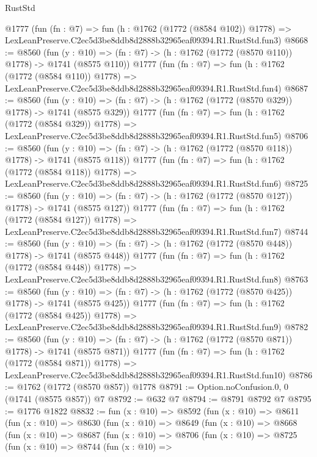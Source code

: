 \begin{lexlean}{RustStd}
\begin{coremodule}
    @1777
    (fun (fn : @7) =>
    fun (h : @1762 (@1772 (@8584 @102)) @1778) =>
    LexLeanPreserve.C2ec5d3be8ddb8d2888b32965eaf09394.R1.RustStd.fun3)
@8668 := @8560
    (fun (y : @10) => (fn : @7) -> (h : @1762 (@1772 (@8570 @110)) @1778) -> @1741 (@8575 @110))
    @1777
    (fun (fn : @7) =>
    fun (h : @1762 (@1772 (@8584 @110)) @1778) =>
    LexLeanPreserve.C2ec5d3be8ddb8d2888b32965eaf09394.R1.RustStd.fun4)
@8687 := @8560
    (fun (y : @10) => (fn : @7) -> (h : @1762 (@1772 (@8570 @329)) @1778) -> @1741 (@8575 @329))
    @1777
    (fun (fn : @7) =>
    fun (h : @1762 (@1772 (@8584 @329)) @1778) =>
    LexLeanPreserve.C2ec5d3be8ddb8d2888b32965eaf09394.R1.RustStd.fun5)
@8706 := @8560
    (fun (y : @10) => (fn : @7) -> (h : @1762 (@1772 (@8570 @118)) @1778) -> @1741 (@8575 @118))
    @1777
    (fun (fn : @7) =>
    fun (h : @1762 (@1772 (@8584 @118)) @1778) =>
    LexLeanPreserve.C2ec5d3be8ddb8d2888b32965eaf09394.R1.RustStd.fun6)
@8725 := @8560
    (fun (y : @10) => (fn : @7) -> (h : @1762 (@1772 (@8570 @127)) @1778) -> @1741 (@8575 @127))
    @1777
    (fun (fn : @7) =>
    fun (h : @1762 (@1772 (@8584 @127)) @1778) =>
    LexLeanPreserve.C2ec5d3be8ddb8d2888b32965eaf09394.R1.RustStd.fun7)
@8744 := @8560
    (fun (y : @10) => (fn : @7) -> (h : @1762 (@1772 (@8570 @448)) @1778) -> @1741 (@8575 @448))
    @1777
    (fun (fn : @7) =>
    fun (h : @1762 (@1772 (@8584 @448)) @1778) =>
    LexLeanPreserve.C2ec5d3be8ddb8d2888b32965eaf09394.R1.RustStd.fun8)
@8763 := @8560
    (fun (y : @10) => (fn : @7) -> (h : @1762 (@1772 (@8570 @425)) @1778) -> @1741 (@8575 @425))
    @1777
    (fun (fn : @7) =>
    fun (h : @1762 (@1772 (@8584 @425)) @1778) =>
    LexLeanPreserve.C2ec5d3be8ddb8d2888b32965eaf09394.R1.RustStd.fun9)
@8782 := @8560
    (fun (y : @10) => (fn : @7) -> (h : @1762 (@1772 (@8570 @871)) @1778) -> @1741 (@8575 @871))
    @1777
    (fun (fn : @7) =>
    fun (h : @1762 (@1772 (@8584 @871)) @1778) =>
    LexLeanPreserve.C2ec5d3be8ddb8d2888b32965eaf09394.R1.RustStd.fun10)
@8786 := @1762 (@1772 (@8570 @857)) @1778
@8791 := Option.noConfusion.{0, 0} (@1741 (@8575 @857)) @7
@8792 := @632 @7
@8794 := @8791 @8792 @7
@8795 := @1776 @1822
@8832 := fun (x : @10) =>
  @8592
    (fun (x : @10) =>
    @8611
      (fun (x : @10) =>
      @8630
        (fun (x : @10) =>
        @8649
          (fun (x : @10) =>
          @8668
            (fun (x : @10) =>
            @8687
              (fun (x : @10) =>
              @8706
                (fun (x : @10) =>
                @8725
                  (fun (x : @10) =>
                  @8744
                    (fun (x : @10) =>

\end{coremodule}
\end{lexlean}

